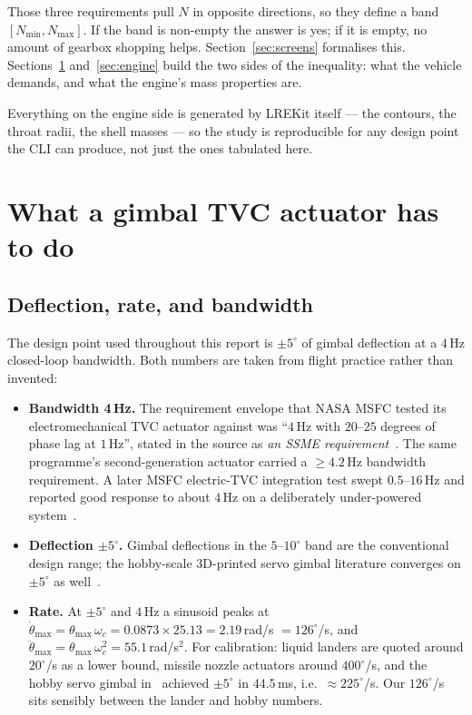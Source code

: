 \documentclass[11pt]{article}
\begin{document}
Those three requirements pull $N$ in opposite directions, so they define a
band $[N_{\min}, N_{\max}]$. If the band is non-empty the answer is yes;
if it is empty, no amount of gearbox shopping helps. Section~\ref{sec:screens}
formalises this. Sections~\ref{sec:req} and~\ref{sec:engine} build the two
sides of the inequality: what the vehicle demands, and what the engine's
mass properties are.

Everything on the engine side is generated by LREKit itself --- the contours,
the throat radii, the shell masses --- so the study is reproducible for any
design point the CLI can produce, not just the ones tabulated here.

\section{What a gimbal TVC actuator has to do}
\label{sec:req}

\subsection{Deflection, rate, and bandwidth}

The design point used throughout this report is $\pm5^\circ$ of gimbal
deflection at a $4$\,Hz closed-loop bandwidth. Both numbers are taken from
flight practice rather than invented:

\begin{itemize}[leftmargin=1.4em,itemsep=2pt]
\item \textbf{Bandwidth 4\,Hz.} The requirement envelope that NASA MSFC
tested its electromechanical TVC actuator against was ``$4$\,Hz with
$20$--$25$ degrees of phase lag at $1$\,Hz'', stated in the source as
\emph{an SSME requirement}~\cite{cowan1994}. The same programme's
second-generation actuator carried a $\geq4.2$\,Hz bandwidth requirement.
A later MSFC electric-TVC integration test swept $0.5$--$16$\,Hz and reported
good response to about $4$\,Hz on a deliberately under-powered
system~\cite{bates2012}.

\item \textbf{Deflection $\pm5^\circ$.} Gimbal deflections in the
$5$--$10^\circ$ band are the conventional design range; the hobby-scale
3D-printed servo gimbal literature converges on $\pm5^\circ$ as
well~\cite{singh2025}.

\item \textbf{Rate.} At $\pm5^\circ$ and $4$\,Hz a sinusoid peaks at
$\dot\theta_{\max} = \theta_{\max}\,\omega_c = 0.0873 \times 25.13
= 2.19$\,rad/s $= 126^\circ$/s, and
$\ddot\theta_{\max} = \theta_{\max}\,\omega_c^2 = 55.1$\,rad/s$^2$.
For calibration: liquid landers are quoted around $20^\circ$/s as a lower
bound, missile nozzle actuators around $400^\circ$/s, and the hobby servo
gimbal in~\cite{singh2025} achieved $\pm5^\circ$ in $44.5$\,ms, i.e.\
$\approx 225^\circ$/s. Our $126^\circ$/s sits sensibly between the lander
and hobby numbers.
\end{itemize}
\end{document}
